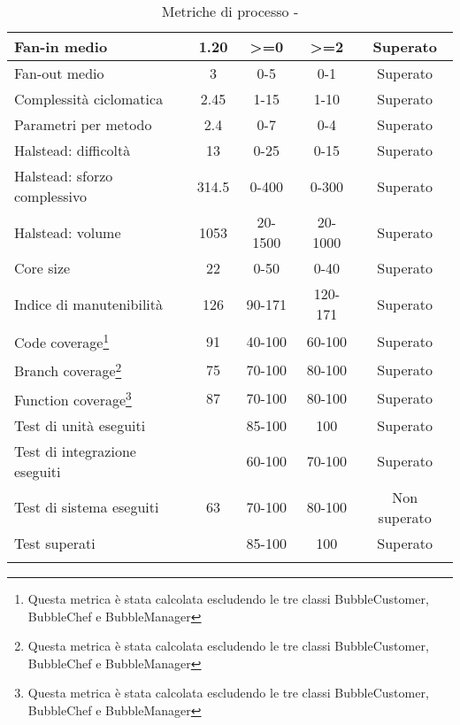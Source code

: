\begin{longtable}{|m{5cm}|c|c|c|c|}
	\hline Fan-in medio & 1.20 & >=0 & >=2 & Superato \\
	\hline Fan-out medio & 3 & 0-5 & 0-1 & Superato \\
	\hline Complessità ciclomatica & 2.45 & 1-15 & 1-10 & Superato \\
	\hline Parametri per metodo & 2.4 & 0-7 & 0-4 & Superato \\
	\hline Halstead: difficoltà & 13 & 0-25 & 0-15 & Superato \\
	\hline Halstead: sforzo complessivo & 314.5 & 0-400 & 0-300 & Superato\\
	\hline Halstead: volume & 1053 & 20-1500 & 20-1000 & Superato \\
	\hline Core size & 22 & 0-50 & 0-40 & Superato \\
	\hline Indice di manutenibilità & 126 & 90-171 & 120-171 & Superato \\
	\hline Code coverage\footnote{Questa metrica è stata calcolata escludendo le tre classi BubbleCustomer, BubbleChef e BubbleManager} & 91 & 40-100 & 60-100 & Superato \\
	\hline Branch coverage\footnote{Questa metrica è stata calcolata escludendo le tre classi BubbleCustomer, BubbleChef e BubbleManager} & 75 & 70-100 & 80-100 & Superato \\
	\hline Function coverage\footnote{Questa metrica è stata calcolata escludendo le tre classi BubbleCustomer, BubbleChef e BubbleManager} & 87 & 70-100 & 80-100 & Superato \\
	\hline Test di unità eseguiti &  & 85-100 & 100 & Superato \\
	\hline Test di integrazione eseguiti &  & 60-100 & 70-100 & Superato \\
	\hline Test di sistema eseguiti & 63 & 70-100 & 80-100 & Non superato \\
	\hline Test superati &  & 85-100 & 100 & Superato \\
	\hline
	\caption{Metriche di processo - \RQ{}}
\end{longtable}

